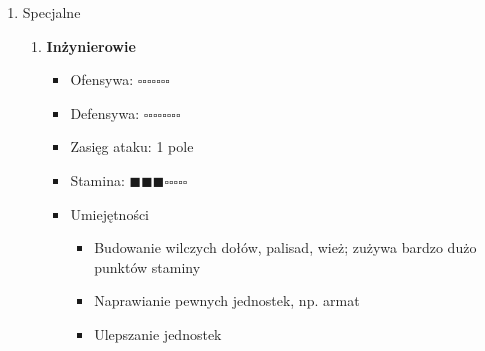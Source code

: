\documentclass[oneside]{lmdEN}%
\begin{document}
\begin{enumerate}
    \item Specjalne
          \begin{enumerate}
              \item \textbf{Inżynierowie}
                    \begin{itemize}
                        \item Ofensywa: $\square\square\square\square\square\square\square$
                        \item Defensywa: $\square\square\square\square\square\square\square\square$
                        \item Zasięg ataku: 1 pole
                        \item Stamina: $\blacksquare\blacksquare\blacksquare\square\square\square\square\square$
                        \item Umiejętności
                              \begin{itemize}
                                  \item Budowanie wilczych dołów, palisad, wież; zużywa bardzo dużo punktów staminy
                                  \item Naprawianie pewnych jednostek, np. armat
                                  \item Ulepszanie jednostek
                              \end{itemize}
                    \end{itemize}
          \end{enumerate}

    
\end{enumerate}


\end{document}
